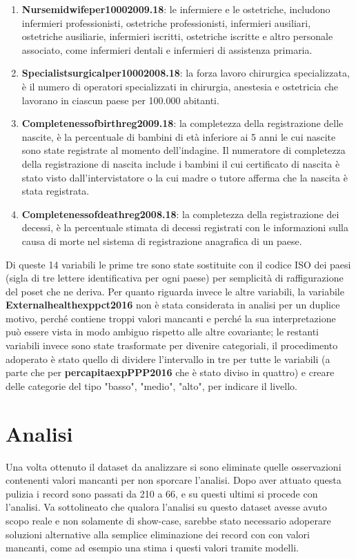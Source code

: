 \documentclass{report}
\begin{document}
\begin{enumerate}
    \item \textbf{Nursemidwifeper10002009.18}: le infermiere e le ostetriche, includono infermieri professionisti, ostetriche professionisti, infermieri ausiliari, ostetriche ausiliarie, infermieri iscritti, ostetriche iscritte e altro personale associato, come infermieri dentali e infermieri di assistenza primaria.
    \item \textbf{Specialistsurgicalper10002008.18}: la forza lavoro chirurgica specializzata, è il numero di operatori specializzati in chirurgia, anestesia e ostetricia che lavorano in ciascun paese per 100.000 abitanti.
    \item \textbf{Completenessofbirthreg2009.18}: la completezza della registrazione delle nascite, è la percentuale di bambini di età inferiore ai 5 anni le cui nascite sono state registrate al momento dell'indagine. Il numeratore di completezza della registrazione di nascita include i bambini il cui certificato di nascita è stato visto dall'intervistatore o la cui madre o tutore afferma che la nascita è stata registrata.
    \item \textbf{Completenessofdeathreg2008.18}: la completezza della registrazione dei decessi, è la percentuale stimata di decessi registrati con le informazioni sulla causa di morte nel sistema di registrazione anagrafica di un paese.
\end{enumerate}

Di queste 14 variabili le prime tre sono state sostituite con il codice ISO dei paesi (sigla di tre lettere identificativa per ogni paese) per semplicità di raffigurazione del poset che ne deriva. Per quanto riguarda invece le altre variabili, la variabile \textbf{Externalhealthexppct2016} non è stata considerata in analisi per un duplice motivo, perché contiene troppi valori mancanti e perché la sua interpretazione può essere vista in modo ambiguo rispetto alle altre covariante; le restanti variabili invece sono state trasformate per divenire categoriali, il procedimento adoperato è stato quello di dividere l'intervallo in tre per tutte le variabili (a parte che per \textbf{percapitaexpPPP2016} che è stato diviso in quattro) e creare delle categorie del tipo "basso", "medio", "alto", per indicare il livello.


\section{Analisi}
Una volta ottenuto il dataset da analizzare si sono eliminate quelle osservazioni contenenti valori mancanti per non sporcare l'analisi. Dopo aver attuato questa pulizia i record sono passati da 210 a 66, e su questi ultimi si procede con l'analisi. Va sottolineato che qualora l'analisi su questo dataset avesse avuto scopo reale e non solamente di show-case, sarebbe stato necessario adoperare soluzioni alternative alla semplice eliminazione dei record con con valori mancanti, come ad esempio una stima i questi valori tramite modelli.
\end{document}
